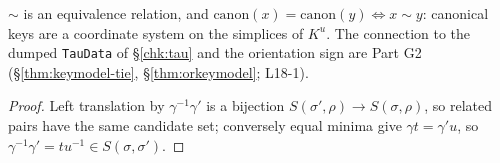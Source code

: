 \begin{theorem}\label{thm:keymodel}
  \leanok
  $\sim$ is an equivalence relation, and $\mathrm{canon}(x)=\mathrm{canon}(y)\iff x\sim y$: canonical keys are a coordinate system on
  the simplices of $K^u$. The connection to the dumped \texttt{TauData} of \S\ref{chk:tau} and the orientation sign are
  Part G2 (\S\ref{thm:keymodel-tie}, \S\ref{thm:orkeymodel}; L18-1).
\end{theorem}
\begin{proof}
  \leanok
  Left translation by $\gamma^{-1}\gamma'$ is a bijection $S(\sigma',\rho)\to S(\sigma,\rho)$, so related pairs have the same
  candidate set; conversely equal minima give $\gamma t=\gamma'u$, so $\gamma^{-1}\gamma'=tu^{-1}\in S(\sigma,\sigma')$.
\end{proof}
